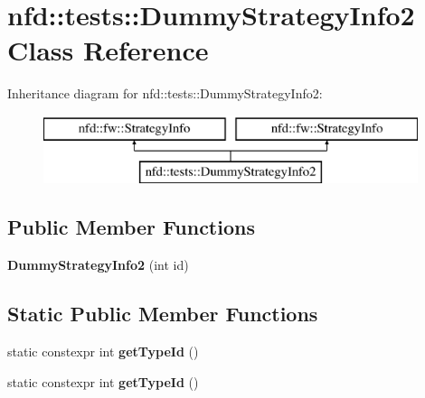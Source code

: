 \hypertarget{classnfd_1_1tests_1_1DummyStrategyInfo2}{}\section{nfd\+:\+:tests\+:\+:Dummy\+Strategy\+Info2 Class Reference}
\label{classnfd_1_1tests_1_1DummyStrategyInfo2}
Inheritance diagram for nfd\+:\+:tests\+:\+:Dummy\+Strategy\+Info2\+:\begin{figure}[H]
\begin{center}
\leavevmode
\includegraphics[height=2.000000cm]{classnfd_1_1tests_1_1DummyStrategyInfo2}
\end{center}
\end{figure}
\subsection*{Public Member Functions}
\begin{DoxyCompactItemize}
\item 
{\bfseries Dummy\+Strategy\+Info2} (int id)\hypertarget{classnfd_1_1tests_1_1DummyStrategyInfo2_a23a335d0b2ba61a546a72e75f25c4a88}{}\label{classnfd_1_1tests_1_1DummyStrategyInfo2_a23a335d0b2ba61a546a72e75f25c4a88}

\end{DoxyCompactItemize}
\subsection*{Static Public Member Functions}
\begin{DoxyCompactItemize}
\item 
static constexpr int {\bfseries get\+Type\+Id} ()\hypertarget{classnfd_1_1tests_1_1DummyStrategyInfo2_ad6daa13352c5b6f1eb5bd8a2a91dd082}{}\label{classnfd_1_1tests_1_1DummyStrategyInfo2_ad6daa13352c5b6f1eb5bd8a2a91dd082}

\item 
static constexpr int {\bfseries get\+Type\+Id} ()\hypertarget{classnfd_1_1tests_1_1DummyStrategyInfo2_ad6daa13352c5b6f1eb5bd8a2a91dd082}{}\label{classnfd_1_1tests_1_1DummyStrategyInfo2_ad6daa13352c5b6f1eb5bd8a2a91dd082}

\end{DoxyCompactItemize}
